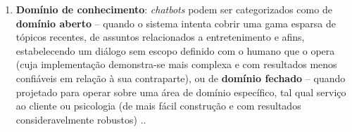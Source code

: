 \begin{enumerate}
    \item \textbf{Domínio de conhecimento}: \textit{chatbots} podem ser categorizados como de \textbf{domínio aberto} -- quando o sistema intenta cobrir uma gama esparsa de tópicos recentes, de assuntos relacionados a entretenimento e afins, estabelecendo um diálogo sem escopo definido com o humano que o opera (cuja implementação demonstra-se mais complexa e com resultados menos confiáveis em relação à sua contraparte), ou de \textbf{domínio fechado} -- quando projetado para operar sobre uma área de domínio específico, tal qual serviço ao cliente ou psicologia (de mais fácil construção e com resultados consideravelmente robustos) \cite{lokman2018modern}..
    

\end{enumerate}
